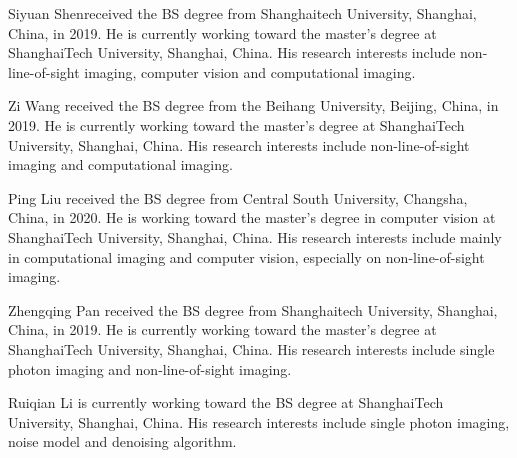\documentclass[10pt,journal,compsoc]{IEEEtran}
\begin{document}
\vspace{-10mm}
\begin{IEEEbiography}
{Siyuan Shen}received the BS degree from Shanghaitech University, Shanghai, China, in 2019.
He is currently working toward the master’s
degree at ShanghaiTech University, Shanghai,
China. His research interests include non-line-of-sight imaging, computer vision and computational imaging.

\end{IEEEbiography}
\vspace{-10mm}
\begin{IEEEbiography}{Zi Wang} received the BS degree from the Beihang University, Beijing, China, in 2019.
He is currently working toward the master’s
degree at ShanghaiTech University, Shanghai,
China. His research interests include non-line-of-sight imaging and computational imaging.
\end{IEEEbiography}
\vspace{-10mm}
\begin{IEEEbiography}{Ping Liu}
received the BS degree from Central South University, Changsha, China, in 2020. He is working toward the master's degree in computer vision at ShanghaiTech University, Shanghai, China. His research interests include mainly in computational imaging and computer vision, especially on non-line-of-sight imaging.


\end{IEEEbiography}
\vspace{-8mm}
\begin{IEEEbiography}{Zhengqing Pan}
received the BS degree from Shanghaitech University, Shanghai, China, in 2019.
He is currently working toward the master’s
degree at ShanghaiTech University, Shanghai,
China. His research interests include single photon imaging and non-line-of-sight imaging.
\end{IEEEbiography}
\vspace{-8mm}
\begin{IEEEbiography}{Ruiqian Li}
is currently working toward the BS
degree at ShanghaiTech University, Shanghai,
China. His research interests include single photon imaging, noise model and denoising algorithm.
\end{IEEEbiography}
\end{document}
